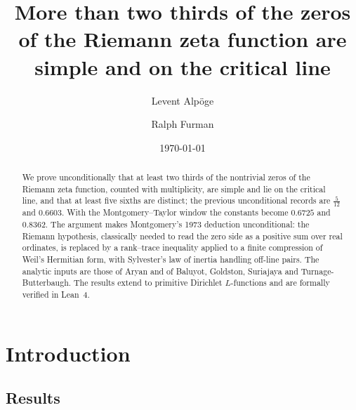 \documentclass[11pt]{amsart}
\title[More than two thirds of the zeta zeros are simple and on the critical line]%
{More than two thirds of the zeros of the Riemann zeta function are simple and on the critical line}
\author{Levent Alp\"oge}
\author{Ralph Furman}
\date{\today}
\theoremstyle{definition}
\theoremstyle{remark}
\numberwithin{equation}{section}
\newcommand{\RR}{\mathbb{R}}
\newcommand{\CC}{\mathbb{C}}
\newcommand{\wh}{\widehat}
\newcommand{\ol}{\overline}
\newcommand{\Gt}{\widetilde{G}}
\newcommand{\npl}{n_{+}}
\newcommand{\one}{\mathbf 1}
\newcommand{\dd}{\,d}
\newcommand{\HS}{\mathrm{HS}}
\begin{document}
\begin{abstract}
We prove unconditionally that at least two thirds of the nontrivial zeros of the Riemann zeta function, counted with multiplicity, are simple and lie on the critical line, and that at least five sixths are distinct; the previous unconditional records are $\tfrac5{12}$ and $0.6603$. With the Montgomery--Taylor window the constants become $0.6725$ and $0.8362$. The argument makes Montgomery's 1973 deduction unconditional: the Riemann hypothesis, classically needed to read the zero side as a positive sum over real ordinates, is replaced by a rank--trace inequality applied to a finite compression of Weil's Hermitian form, with Sylvester's law of inertia handling off-line pairs. The analytic inputs are those of Aryan and of Baluyot, Goldston, Suriajaya and Turnage-Butterbaugh. The results extend to primitive Dirichlet $L$-functions and are formally verified in Lean~4.
\end{abstract}

\maketitle


\section{Introduction}\label{sec:intro}

\subsection{Results}\label{subsec:results}
\end{document}
